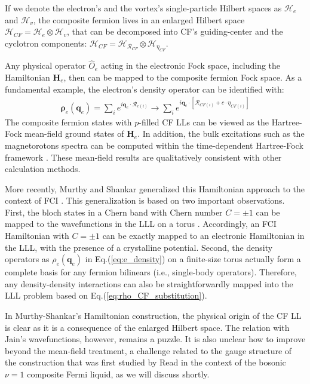 If we denote the electron's and the vortex's single-particle Hilbert spaces as $\mathcal H_e$ and $\mathcal H_v$,  the composite fermion lives in an enlarged Hilbert space $\mathcal H_{CF}=\mathcal H_e\otimes \mathcal H_v$, that can be decomposed into CF's guiding-center and the cyclotron components: $\mathcal H_{CF}=\mathcal H_{\mathcal R_{CF}}\otimes \mathcal H_{\eta_{CF}}$. 

Any physical operator $\hat O_e$ acting in the electronic Fock space, including the Hamiltonian $\mathbf H_e$, then can be mapped to the composite fermion Fock space. As a fundamental example, the electron's density operator can be identified with:
\begin{align}
\pmb{\boldsymbol\rho}_e(\mathbf q_e)=\sum_{i}e^{i\mathbf q_e\cdot \mathcal R_{e(i)}} \rightarrow \sum_{i}e^{i\mathbf q_e\cdot\left[\mathcal R_{CF(i)}+c\cdot\eta_{CF(i)}\right]}  \label{eq:rho_CF_substitution}
\end{align}
The composite fermion states with $p$-filled CF LLs can be viewed as the Hartree-Fock mean-field ground states of $\mathbf H_e$. In addition, the bulk excitations such as the magnetorotons spectra can be computed within the time-dependent Hartree-Fock framework \cite{murthy1999hamiltonian, murthy2001hamiltonian}. These mean-field results are qualitatively consistent with other calculation methods.

More recently, Murthy and Shankar generalized this Hamiltonian approach to the context of FCI \cite{murthy2012hamiltonian}. This generalization is based on two important observations. First, the bloch states in a Chern band with Chern number $C=\pm 1$ can be mapped to the wavefunctions in the LLL on a torus \cite{haldane1985periodic}. Accordingly, an FCI Hamiltonian with $C=\pm 1$ can be exactly mapped to an electronic Hamiltonian in the LLL, with the presence of a crystalline potential. Second, the density operators as $\rho_e(\mathbf q_e)$ in Eq.(\ref{eq:e_density}) on a finite-size torus actually form a complete basis for any fermion bilinears (i.e., single-body operators). Therefore, any density-density interactions can also be straightforwardly mapped into the LLL problem based on Eq.(\ref{eq:rho_CF_substitution}).

In Murthy-Shankar's Hamiltonian construction, the physical origin of the CF LL is clear as it is a consequence of the enlarged Hilbert space. The relation with Jain's wavefunctions, however, remains a puzzle. It is also unclear how to improve beyond the mean-field treatment, a challenge related to the gauge structure of the construction that was first studied by Read \cite{read1998lowest} in the context of the bosonic $\nu=1$ composite Fermi liquid, as we will discuss shortly. 

